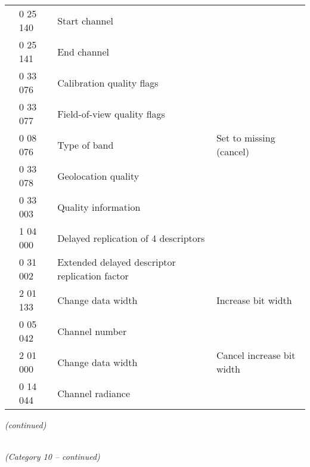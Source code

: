 \begin{longtable}[]{@{}llll@{}}
& 0 25 140 & Start channel &\tabularnewline
& 0 25 141 & End channel &\tabularnewline
& 0 33 076 & Calibration quality flags &\tabularnewline
& 0 33 077 & Field-of-view quality flags &\tabularnewline
& 0 08 076 & Type of band & Set to missing (cancel)\tabularnewline
& 0 33 078 & Geolocation quality &\tabularnewline
& 0 33 003 & Quality information &\tabularnewline
& 1 04 000 & Delayed replication of 4 descriptors &\tabularnewline
& 0 31 002 & Extended delayed descriptor replication factor &\tabularnewline
& 2 01 133 & Change data width & Increase bit width\tabularnewline
& 0 05 042 & Channel number &\tabularnewline
& 2 01 000 & Change data width & Cancel increase bit width\tabularnewline
& 0 14 044 & Channel radiance &\tabularnewline
\bottomrule
\end{longtable}

\emph{(continued)}

\emph{\\
(Category 10 -- continued)}

